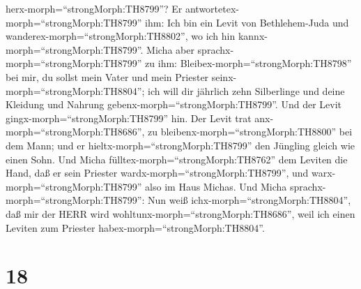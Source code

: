herx-morph=``strongMorph:TH8799''? Er
antwortetex-morph=``strongMorph:TH8799'' ihm: Ich bin ein Levit von
Bethlehem-Juda und wanderex-morph=``strongMorph:TH8802'', wo ich hin
kannx-morph=``strongMorph:TH8799''.  Micha aber
sprachx-morph=``strongMorph:TH8799'' zu ihm:
Bleibex-morph=``strongMorph:TH8798'' bei mir, du sollst mein Vater und
mein Priester seinx-morph=``strongMorph:TH8804''; ich will dir jährlich
zehn Silberlinge und deine Kleidung und Nahrung
gebenx-morph=``strongMorph:TH8799''. Und der Levit
gingx-morph=``strongMorph:TH8799'' hin.  Der Levit trat
anx-morph=``strongMorph:TH8686'', zu
bleibenx-morph=``strongMorph:TH8800'' bei dem Mann; und er
hieltx-morph=``strongMorph:TH8799'' den Jüngling gleich wie einen Sohn.
 Und Micha fülltex-morph=``strongMorph:TH8762'' dem Leviten
die Hand, daß er sein Priester wardx-morph=``strongMorph:TH8799'', und
warx-morph=``strongMorph:TH8799'' also im Haus Michas.  Und
Micha sprachx-morph=``strongMorph:TH8799'': Nun weiß
ichx-morph=``strongMorph:TH8804'', daß mir der HERR wird
wohltunx-morph=``strongMorph:TH8686'', weil ich einen Leviten zum
Priester habex-morph=``strongMorph:TH8804''.

\hypertarget{section-17}{%
\section{18}\label{section-17}}


